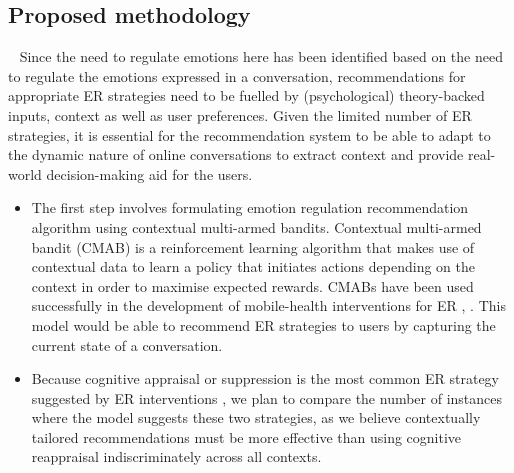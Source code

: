 \subsection{Proposed methodology}~\label{subsec:RQs}
Since the need to regulate emotions here has been identified based on the need to regulate the emotions expressed in a conversation, recommendations for appropriate ER strategies need to be fuelled by (psychological) theory-backed inputs, context as well as user preferences. Given the limited number of ER strategies, it is essential for the recommendation system to be able to adapt to the dynamic nature of online conversations to extract context and provide real-world decision-making aid for the users.
\begin{itemize}
    \item The first step involves formulating emotion regulation recommendation algorithm using contextual multi-armed bandits. Contextual multi-armed bandit (CMAB) is a reinforcement learning algorithm that makes use of contextual data to learn a policy that initiates actions depending on the context in order to maximise expected rewards. CMABs have been used successfully in the development of mobile-health interventions for ER \cite{beltzer2022building}, \cite{ameko2020offline}. This model would be able to recommend ER strategies to users by capturing the current state of a conversation.
    \item Because cognitive appraisal or suppression is the most common ER strategy suggested by ER interventions \cite{aldao2010emotion}, we plan to compare the number of instances where the model suggests these two strategies, as we believe contextually tailored recommendations must be more effective than using cognitive reappraisal indiscriminately across all contexts.
\end{itemize}